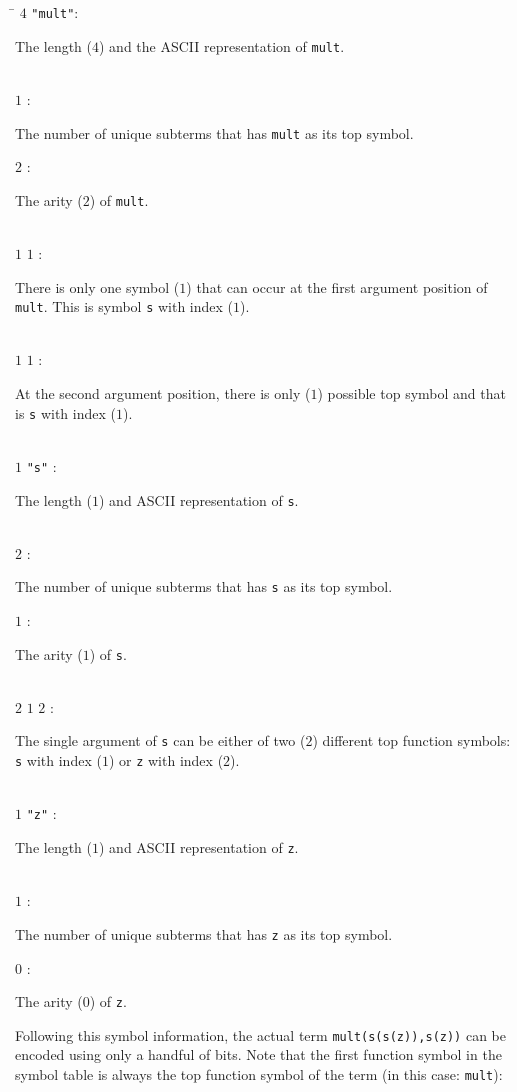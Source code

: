 \documentclass{article}
\newcommand{\tabline}[2]
{#1\>:
\begin{minipage}[t]{\textwidth-1.5cm}
#2
\end{minipage}}
\begin{document}
\begin{tabbing}
\hspace{1.5cm}\=\kill
\tabline{$4$ \texttt{"mult"}}{The length ($4$) and the ASCII representation of \texttt{mult}.}\\
\tabline{$1$                }{The number of unique subterms that has \texttt{mult} as its top symbol.}
\tabline{$2$                }{The arity ($2$) of \texttt{mult}.}\\
\tabline{$1$ $1$            }{There is only one symbol ($1$) that can occur at the first argument position of
                              \texttt{mult}. This is symbol \texttt{s} with index ($1$).}\\
\tabline{$1$ $1$            }{At the second argument position, there is only ($1$) possible top symbol and that is
                              \texttt{s} with index ($1$).}\\
\tabline{$1$ \texttt{"s"}   }{The length ($1$) and ASCII representation of \texttt{s}.}\\
\tabline{$2$                }{The number of unique subterms that has \texttt{s} as its top symbol.}
\tabline{$1$                }{The arity ($1$) of \texttt{s}.}\\
\tabline{$2$ $1$ $2$        }{The single argument of \texttt{s} can be either of two ($2$) different top function
                              symbols: \texttt{s} with index ($1$) or \texttt{z} with index ($2$).}\\
\tabline{$1$ \texttt{"z"}   }{The length ($1$) and ASCII representation of \texttt{z}.}\\
\tabline{$1$                }{The number of unique subterms that has \texttt{z} as its top symbol.}
\tabline{$0$                }{The arity ($0$) of \texttt{z}.}
\end{tabbing}

Following this symbol information, the actual term \texttt{mult(s(s(z)),s(z))} can be encoded using only
a handful of bits. Note that the first function symbol in the symbol table is always the top function symbol
of the term (in this case: \texttt{mult}):
\end{document}
